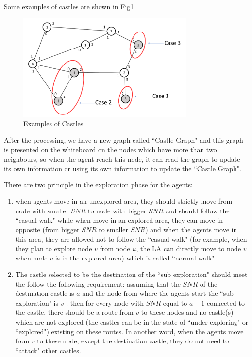 Some examples of castles are shown in Fig\ref{fig:CastleExample}
\begin{figure}[H]
  \centering  
  \includegraphics[width=3.5in]{figures/CastleExample.png}
  \caption{Examples of Castles}\label{fig:CastleExample}
\end{figure} 

After the processing, we have a new graph called ``Castle Graph" and this graph is presented on the whiteboard on the nodes which have more than two neighbours, so when the agent reach this node, it can read the graph to update its own information or using its own information to update the ``Castle Graph". 

There are two principle in the exploration phase for the agents:
\begin{enumerate}
\item when agents move in an unexplored area, they should strictly move from node with smaller $SNR$ to node with bigger $SNR$ and should follow the ``casual walk" while when move in an explored area, they can move in opposite (from bigger $SNR$ to smaller $SNR$) and when the agents move in this area, they are allowed not to follow the ``casual walk" (for example, when they plan to explore node $v$ from node $u$, the LA can directly move to node $v$ when node $v$ is in the explored area) which is called ``normal walk".
\item The castle selected to be the destination of the ``sub exploration" should meet the follow the following requirement: assuming that the $SNR$ of the destination castle is $a$ and the node from where the agents start the ``sub exploration" is $v$  , then for every node with $SNR$ equal to $a-1$ connected to the castle, there should be a route from $v$ to these nodes and no castle(s) which are not explored (the castles can be in the state of ``under exploring" or ``explored") existing on these routes. In another word, when the agents move from $v$ to these node, except the destination castle, they do not need to ``attack" other castles. 
\end{enumerate}  

